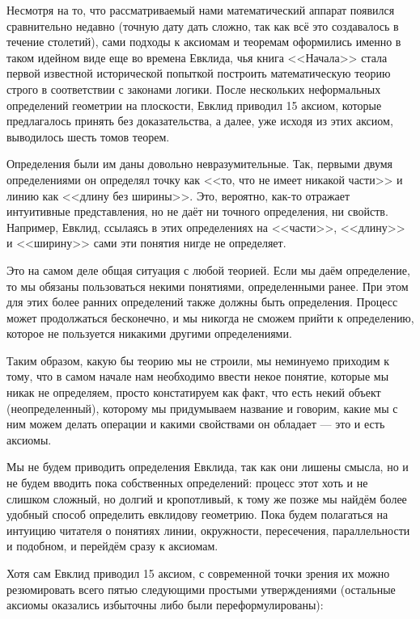 Несмотря на то, что рассматриваемый нами математический аппарат появился сравнительно недавно (точную дату дать сложно, так как всё это создавалось в течение столетий), сами подходы к аксиомам и теоремам оформились именно в таком идейном виде еще во времена Евклида, чья книга <<Начала>> стала первой известной исторической попыткой построить математическую теорию строго в соответствии с законами логики. После нескольких неформальных определений геометрии на плоскости, Евклид приводил 15 аксиом, которые предлагалось принять без доказательства, а далее, уже исходя из этих аксиом, выводилось шесть томов теорем.

Определения были им даны довольно невразумительные. Так, первыми двумя определениями он определял точку как <<то, что не имеет никакой части>> и линию как <<длину без ширины>>. Это, вероятно, как-то отражает интуитивные представления, но не даёт ни точного определения, ни свойств. Например, Евклид, ссылаясь в этих определениях на <<части>>, <<длину>> и <<ширину>> сами эти понятия нигде не определяет.

Это на самом деле общая ситуация с любой теорией. Если мы даём определение, то мы обязаны пользоваться некими понятиями, определенными ранее. При этом для этих более ранних определений также должны быть определения. Процесс может продолжаться бесконечно, и мы никогда не сможем прийти к определению, которое не пользуется никакими другими определениями.

Таким образом, какую бы теорию мы не строили, мы неминуемо приходим к тому, что в самом начале нам необходимо ввести некое понятие, которые мы никак не определяем, просто констатируем как факт, что есть некий объект (неопределенный), которому мы придумываем название и говорим, какие мы с ним можем делать операции и какими свойствами он обладает --- это и есть аксиомы.

Мы не будем приводить определения Евклида, так как они лишены смысла, но и не будем вводить пока собственных определений: процесс этот хоть и не слишком сложный, но долгий и кропотливый, к тому же позже мы найдём более удобный способ определить евклидову геометрию. Пока будем полагаться на интуицию читателя о понятиях линии, окружности, пересечения, параллельности и подобном, и перейдём сразу к аксиомам.

Хотя сам Евклид приводил 15 аксиом, с современной точки зрения их можно резюмировать всего пятью следующими простыми утверждениями (остальные аксиомы оказались избыточны либо были переформулированы):

